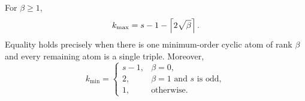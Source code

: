 \begin{corollary}
For $\beta\ge1$,
\[
 k_{\max}=s-1-\left\lceil 2\sqrt{\beta}\right\rceil.
\]
Equality holds precisely when there is one minimum-order cyclic atom of rank
$\beta$ and every remaining atom is a single triple.  Moreover,
\[
 k_{\min}=
 \begin{cases}
 s-1,&\beta=0,\\
 2,&\beta=1\text{ and }s\text{ is odd},\\
 1,&\text{otherwise}.
 \end{cases}
\]
\end{corollary}
